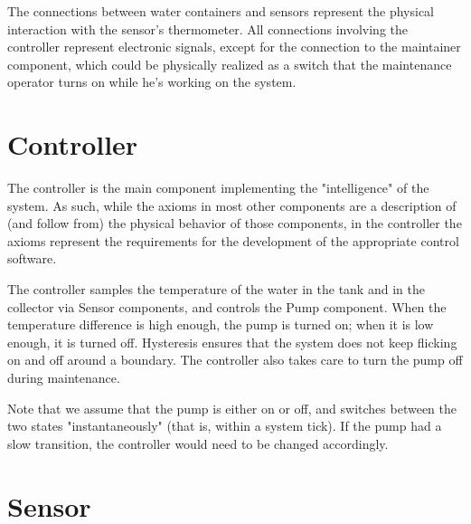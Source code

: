 \documentclass[a4paper,12pt]{article}
\begin{document}
The connections between water containers and sensors represent the physical interaction with the sensor's thermometer. All connections involving the controller represent electronic signals, except for the connection to the maintainer component, which could be physically realized as a switch that the maintenance operator turns on while he's working on the system.

\setmonofont[Scale=0.8]{Menlo}

\pagebreak
\begin{adjustwidth}{-4em}{-4em}
\end{adjustwidth}
\pagebreak

\section{Controller}

The controller is the main component implementing the "intelligence" of the system. As such, while the axioms in most other components are a description of (and follow from) the physical behavior of those components, in the controller the axioms represent the requirements for the development of the appropriate control software.

The controller samples the temperature of the water in the tank and in the collector via Sensor components, and controls the Pump component. When the temperature difference is high enough, the pump is turned on; when it is low enough, it is turned off. Hysteresis ensures that the system does not keep flicking on and off around a boundary. The controller also takes care to turn the pump off during maintenance.

Note that we assume that the pump is either on or off, and switches between the two states "instantaneously" (that is, within a system tick). If the pump had a slow transition, the controller would need to be changed accordingly.

\pagebreak
\begin{adjustwidth}{-4em}{-4em}
\end{adjustwidth}
\pagebreak

\section{Sensor}
\end{document}
